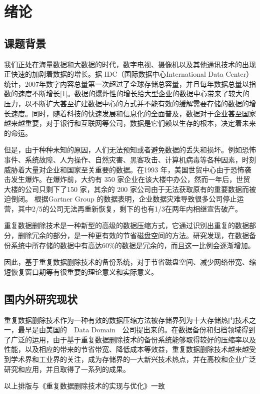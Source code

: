 \chapter{绪论}\thispagestyle{main}
\section{课题背景}
\par 我们正处在海量数据和大数据的时代，数字电视、摄像机以及其他通讯技术的出现正快速的加剧着数据的增长。据 IDC（国际数据中心International Data Center）统计，2007年数字内容总量第一次超过了全球存储总容量，并且每年数据总量以指数的速度不断增长[1]。数据的爆炸性的增长给大型企业的数据中心带来了较大的压力，以不断扩大甚至扩建数据中心的方式并不能有效的缓解需要存储的数据的增长速度。同时，随着科技的快速发展和信息化的全面普及，数据对于企业甚至国家越来越重要，对于银行和互联网等公司，数据是它们赖以生存的根本，决定着未来的命运。
\par 但是，由于种种未知的原因，人们无法预知或者避免数据的丢失和损坏。例如恐怖事件、系统故障、人为操作、自然灾害、黑客攻击、计算机病毒等各种因素，时刻威胁着大量对企业和国家至关重要的数据。在1993 年，美国世贸中心由于恐怖袭击发生爆炸。在爆炸前，大约有 350 家企业在该大楼中办公，然而一年后，世贸大楼的公司只剩下了150 家，其余的 200 家公司由于无法获取原有的重要数据而被迫倒闭。 根据Gartner Group 的数据表明，企业数据灾难导致很多公司停止运营，其中2/5的公司无法再重新恢复，剩下的也有1/3在两年内相继宣告破产。
\par 重复数据删除技术是一种新型的高级的数据压缩方式，它通过识别出重复的数据部分，删除冗余的部分，是一种更有效的节省磁盘空间的方法。研究发现，在数据备份系统中所存储的数据中有高达60\%的数据是冗余的，而且这一比例会逐渐增加。
\par 因此，基于重复数据删除技术的备份系统，对于节省磁盘空间、减少网络带宽、缩短恢复窗口期等有很重要的理论意义和实际意义。
\section{国内外研究现状}
\par 重复数据删除技术作为一种有效的数据压缩方法被存储界列为十大存储热门技术之一，最早是由美国的\ \ Data Domain\ \ 公司提出来的。在数据备份和归档领域得到了广泛的运用，由于基于重复数据删除技术的备份系统能够取得较好的压缩率以及性能，以及相应的带来的节省带宽、降低成本等效益，重复数据删除技术越来越受到学术界和工业界的关注，成为存储界的一大新兴技术热点，并在高校和企业广泛研究和应用，并且取得了一系列的成果。
\par 以上排版与《重复数据删除技术的实现与优化》一致
